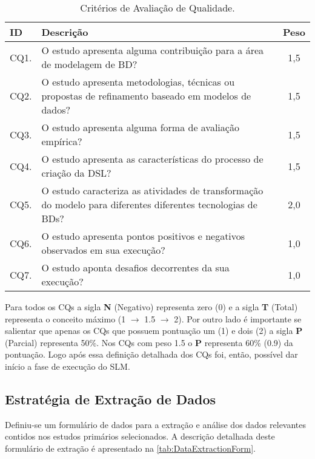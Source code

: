 \begin{table}[!htb]
    \centering
    \small
    \caption{Critérios de Avaliação de Qualidade.}
    \label{tab:CAQ}
    \begin{tabular}{l|p{12cm}|c}
    \bottomrule
    \rowcolor[HTML]{C0C0C0}
    \textbf{ID} & \textbf{Descrição} & \textbf{Peso} 
    \\ 
    \hline
    CQ1. & O estudo apresenta alguma contribuição para a área de modelagem de \ac{BD}? & 1,5 
    \\
    CQ2. & O estudo apresenta metodologias, técnicas ou propostas de refinamento baseado em modelos de dados? & 1,5 
    \\
    CQ3. & O estudo apresenta alguma forma de avaliação empírica? & 1,5 
    \\
    CQ4. & O estudo apresenta as características do processo de criação da DSL? & 1,5 
    \\
    CQ5. & O estudo caracteriza as atividades de transformação do modelo para diferentes diferentes tecnologias de \acp{BD}? & 2,0 
    \\
    CQ6. & O estudo apresenta pontos positivos e negativos observados em sua execução? & 1,0 
    \\
    CQ7. & O estudo aponta desafios decorrentes da sua execução? & 1,0 
    \\
    \toprule
    \end{tabular}
\end{table}
    
Para todos os \acp{CQ} a sigla \textbf{N} (Negativo) representa zero (0) e a sigla \textbf{T} (Total) representa o conceito máximo (1 $\rightarrow$ 1.5 $\rightarrow$ 2). 
Por outro lado é importante se salientar que apenas os \acp{CQ} que possuem pontuação um (1) e  dois (2) a sigla \textbf{P} (Parcial) representa 50\%. 
Nos \acp{CQ} com peso 1.5 o \textbf{P} representa 60\% (0.9) da pontuação. 
Logo após essa definição detalhada dos \acp{CQ} foi, então, possível dar início a fase de execução do \ac{SLM}. 
    
     \subsection{Estratégia de Extração de Dados} \label{ssec:EstratExtDados}

Definiu-se um formulário de dados para a extração e análise dos dados relevantes contidos nos estudos primários selecionados. 
A descrição detalhada deste formulário de extração é apresentado na \autoref{tab:DataExtractionForm}.

